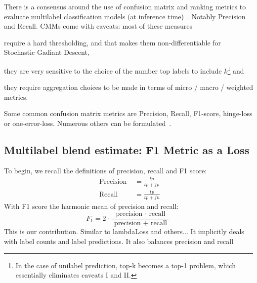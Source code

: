 There is a consensus around the use of confusion matrix  and ranking metrics to evaluate multilabel classification models (at inference time)~\cite{multilabelMetrics, weightedMetrics, unifiedView}. Notably Precision and Recall. CMMs come with caveats: most of these measures 
\begin{enumerate*}
\item require a hard thresholding, and that makes them non-differentiable for Stochastic Gadiant Descent, 
\item they are very sensitive to the choice of the number top labels to include $k$\footnote{In the case of unilabel prediction, top-k becomes a top-1 problem, which essentially eliminates caveats I and II.} and 
\item they require aggregation choices to be made in terms of micro / macro / weighted metrics.
\end{enumerate*}
Some common confusion matrix metrics are Precision, Recall, F1-score, hinge-loss or one-error-loss. Numerous others can be formulated~\cite{unifiedView}.




\subsection{Multilabel blend estimate: F1 Metric as a Loss}
\label{section:background:metricsAsLosses}

To begin, we recall the definitions of precision, recall and F1 score:
%
\begin{equation}
	\begin{aligned} 
		\text { Precision } &=\frac{t p}{t p+f p} \\ 
		\text{ Recall } &=\frac{t p}{t p+f n} 
	\end{aligned}
\end{equation}
%
With F1 score the harmonic mean of precision and recall:
%
\begin{equation}
F_1=2 \cdot \frac{\text { precision } \cdot \text { recall }}{\text { precision }+\text { recall }}
\end{equation}
%
This is our contribution. Similar to lambdaLoss and others... It implicitly deals with label counts and label predictions. It also balances precision and recall

